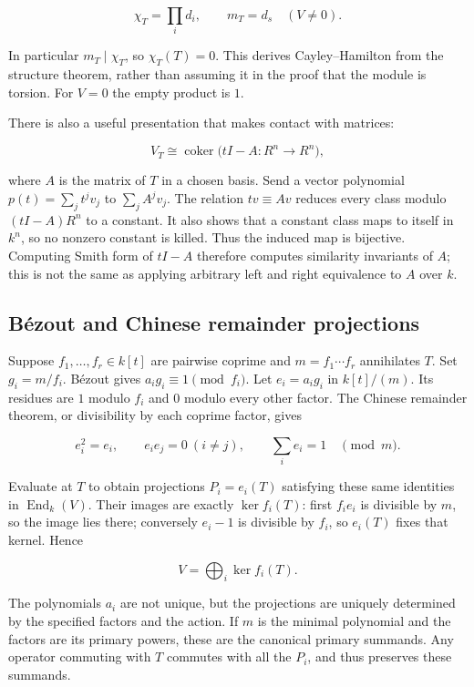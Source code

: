 \documentclass[
  11pt,
]{article}
\begin{document}
\[\chi_T=\prod_i d_i,\qquad m_T=d_s\quad(V\ne0).\]

In particular \(m_T\mid\chi_T\), so \(\chi_T(T)=0\). This derives
Cayley--Hamilton from the structure theorem, rather than assuming it in
the proof that the module is torsion. For \(V=0\) the empty product is
\(1\).

There is also a useful presentation that makes contact with matrices:

\[V_T\cong\operatorname{coker}\bigl(tI-A:R^n\to R^n\bigr),\]

where \(A\) is the matrix of \(T\) in a chosen basis. Send a vector
polynomial \(p(t)=\sum_j t^jv_j\) to \(\sum_j A^jv_j\). The relation
\(t v\equiv Av\) reduces every class modulo \((tI-A)R^n\) to a constant.
It also shows that a constant class maps to itself in \(k^n\), so no
nonzero constant is killed. Thus the induced map is bijective. Computing
Smith form of \(tI-A\) therefore computes similarity invariants of
\(A\); this is not the same as applying arbitrary left and right
equivalence to \(A\) over \(k\).

\subsection{Bézout and Chinese remainder
projections}\label{buxe9zout-and-chinese-remainder-projections}

Suppose \(f_1,\ldots,f_r\in k[t]\) are pairwise coprime and
\(m=f_1\cdots f_r\) annihilates \(T\). Set \(g_i=m/f_i\). Bézout gives
\(a_i g_i\equiv1\pmod{f_i}\). Let \(e_i=a_i g_i\) in \(k[t]/(m)\). Its
residues are \(1\) modulo \(f_i\) and \(0\) modulo every other factor.
The Chinese remainder theorem, or divisibility by each coprime factor,
gives

\[e_i^2=e_i,\qquad e_ie_j=0\ (i\ne j),\qquad\sum_i e_i=1
\quad\pmod m.\]

Evaluate at \(T\) to obtain projections \(P_i=e_i(T)\) satisfying these
same identities in \(\operatorname{End}_k(V)\). Their images are exactly
\(\ker f_i(T)\): first \(f_i e_i\) is divisible by \(m\), so the image
lies there; conversely \(e_i-1\) is divisible by \(f_i\), so \(e_i(T)\)
fixes that kernel. Hence

\[V=\bigoplus_i\ker f_i(T).\]

The polynomials \(a_i\) are not unique, but the projections are uniquely
determined by the specified factors and the action. If \(m\) is the
minimal polynomial and the factors are its primary powers, these are the
canonical primary summands. Any operator commuting with \(T\) commutes
with all the \(P_i\), and thus preserves these summands.
\end{document}

